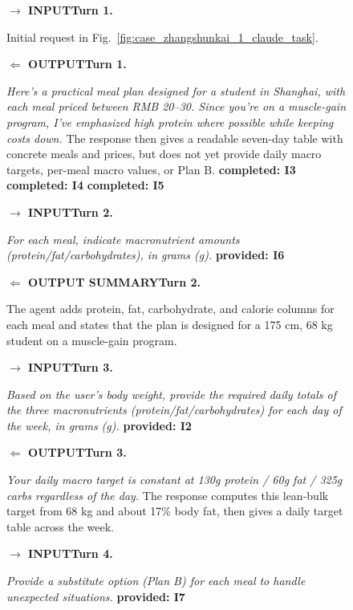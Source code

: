 \documentclass{llmxive}
\providecommand{\tcolorboxCase}[2]{\begin{tcolorbox}[
    title=#1,
    colback=casebg, 
    colframe=casetitlebg,
    rounded corners,
    sharp corners=northeast,
    sharp corners=southwest,
    width=1.00\linewidth,
    boxsep=2pt,
    top=2pt,
    bottom=2pt,
    enhanced,
    breakable,
    before=\setlength{\parindent}{0pt},
]

#2
\end{tcolorbox}
}
\providecommand{\caseZhangshunkaiOneTag}[3]{    {\setlength{\fboxsep}{1.6pt}\colorbox{#1}{\scriptsize\textbf{#3}}}}
\providecommand{\caseZhangshunkaiOneLine}[3]{    \caseZhangshunkaiOneTag{#1}{#2}{#3}\hspace{3pt}}
\providecommand{\caseZhangshunkaiOneIO}[3]{    \vspace{2pt}
    \noindent\caseZhangshunkaiOneLine{#1}{white}{#2}\textbf{#3}
}
\begin{document}
\begin{figure}[!htbp]
    \centering
    \tcolorboxCase{Case Study -- Researcher -- Claude 4.6 Opus: Trajectory and Scores}{
    \small
    \caseZhangshunkaiOneIO{blue!65!black}{$\rightarrow$ INPUT}{Turn 1.}
    Initial request in Fig.~\ref{fig:case_zhangshunkai_1_claude_task}.

    \caseZhangshunkaiOneIO{green!45!black}{$\Leftarrow$ OUTPUT}{Turn 1.}
    \emph{Here's a practical meal plan designed for a student in Shanghai, with each meal priced between RMB 20--30. Since you're on a muscle-gain program, I've emphasized high protein where possible while keeping costs down.}
    The response then gives a readable seven-day table with concrete meals and prices, but does not yet provide daily macro targets, per-meal macro values, or Plan B.
    \caseZhangshunkaiOneTag{green!12}{green!45!black}{completed: I3}
    \hspace{2pt}
    \caseZhangshunkaiOneTag{green!12}{green!45!black}{completed: I4}
    \hspace{2pt}
    \caseZhangshunkaiOneTag{green!12}{green!45!black}{completed: I5}

    \vspace{3pt}
    \caseZhangshunkaiOneIO{blue!65!black}{$\rightarrow$ INPUT}{Turn 2.}
    \emph{For each meal, indicate macronutrient amounts (protein/fat/carbohydrates), in grams (g).}
    \caseZhangshunkaiOneTag{red!15}{red!70!black}{provided: I6}

    \caseZhangshunkaiOneIO{green!45!black}{$\Leftarrow$ OUTPUT SUMMARY}{Turn 2.}
    The agent adds protein, fat, carbohydrate, and calorie columns for each meal and states that the plan is designed for a 175 cm, 68 kg student on a muscle-gain program.

    \vspace{3pt}
    \caseZhangshunkaiOneIO{blue!65!black}{$\rightarrow$ INPUT}{Turn 3.}
    \emph{Based on the user's body weight, provide the required daily totals of the three macronutrients (protein/fat/carbohydrates) for each day of the week, in grams (g).}
    \caseZhangshunkaiOneTag{red!15}{red!70!black}{provided: I2}

    \caseZhangshunkaiOneIO{green!45!black}{$\Leftarrow$ OUTPUT}{Turn 3.}
    \emph{Your daily macro target is constant at 130g protein / 60g fat / 325g carbs regardless of the day.}
    The response computes this lean-bulk target from 68 kg and about 17\% body fat, then gives a daily target table across the week.

    \vspace{3pt}
    \caseZhangshunkaiOneIO{blue!65!black}{$\rightarrow$ INPUT}{Turn 4.}
    \emph{Provide a substitute option (Plan B) for each meal to handle unexpected situations.}
    \caseZhangshunkaiOneTag{red!15}{red!70!black}{provided: I7}

}
\end{figure}
\end{document}

